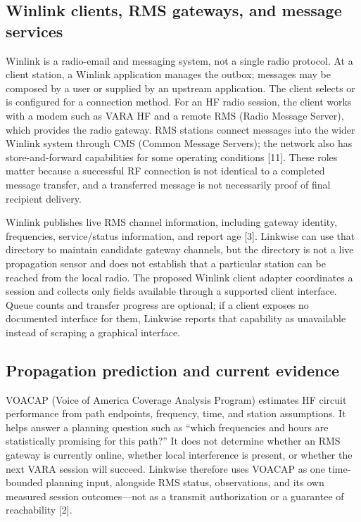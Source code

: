 \documentclass[11pt,a4paper]{article}
\begin{document}
\subsection{Winlink clients, RMS gateways, and message services}
Winlink is a radio-email and messaging system, not a single radio protocol.
At a client station, a Winlink application manages the outbox; messages may
be composed by a user or supplied by an upstream application. The client
selects or is configured for a connection method. For an HF radio session,
the client works with a modem such as VARA HF and a remote RMS (Radio Message
Server), which provides the radio gateway. RMS stations connect messages
into the wider Winlink system through CMS (Common Message Servers); the
network also has
store-and-forward capabilities for some operating conditions [11]. These
roles matter because a successful RF connection is not identical to a
completed message transfer, and a transferred message is not necessarily
proof of final recipient delivery.

Winlink publishes live RMS channel information, including gateway identity,
frequencies, service/status information, and report age [3]. Linkwise can
use that directory to maintain candidate gateway channels, but the directory
is not a live propagation sensor and does not establish that a particular
station can be reached from the local radio. The proposed Winlink client
adapter coordinates a session and collects only fields available through a
supported client interface. Queue counts and transfer progress are optional;
if a client exposes no documented interface for them, Linkwise reports that
capability as unavailable instead of scraping a graphical interface.

\subsection{Propagation prediction and current evidence}
VOACAP (Voice of America Coverage Analysis Program) estimates HF circuit
performance from path endpoints, frequency, time, and station assumptions.
It helps answer a planning question such as “which frequencies and hours are
statistically promising for this path?” It does not determine whether an RMS
gateway is currently online, whether local interference is present, or
whether the next VARA session will succeed. Linkwise therefore uses VOACAP as
one time-bounded planning input, alongside RMS status, observations, and its
own measured session outcomes—not as a transmit authorization or a guarantee
of reachability [2].
\end{document}
